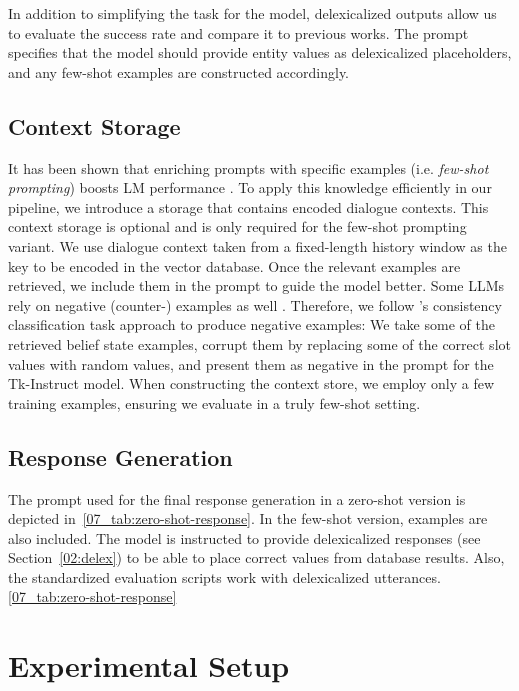 In addition to simplifying the task for the model, delexicalized outputs allow us to evaluate the success rate and compare it to previous works.
The prompt specifies that the model should provide entity values as delexicalized placeholders, and any few-shot examples are constructed accordingly.

\subsection{Context Storage}
\label{07:sec:context-store}
It has been shown that enriching prompts with specific examples (i.e. \emph{few-shot prompting}) boosts LM performance \cite{madotto2020language,brown2020language}.
To apply this knowledge efficiently in our pipeline, we introduce a storage that contains encoded dialogue contexts.
This context storage is optional and is only required for the few-shot prompting variant.
We use dialogue context taken from a fixed-length history window as the key to be encoded in the vector database.
Once the relevant examples are retrieved, we include them in the prompt to guide the model better.
Some LLMs rely on negative (counter-) examples as well \cite{supernaturalinstructions}.
Therefore, we follow \citet{peng-etal-2021-soloist}'s consistency classification task approach to produce negative examples: We take some of the retrieved belief state examples, corrupt them by replacing some of the correct slot values with random values, and present them as negative in the prompt for the Tk-Instruct model.
When constructing the context store, we employ only a few training examples, ensuring we evaluate in a truly few-shot setting.

\subsection{Response Generation}
\label{07:sec:response}
The prompt used for the final response generation in a zero-shot version is depicted in~\ref{07_tab:zero-shot-response}.
In the few-shot version, examples are also included.
The model is instructed to provide delexicalized responses (see Section~\ref{02:delex}) to be able to place correct values from database results.
Also, the standardized evaluation scripts work with delexicalized utterances.
\ref{07_tab:zero-shot-response}

\section{Experimental Setup}
\label{07:sec:experiments}


